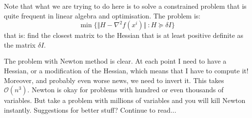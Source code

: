 \par Note that what we are trying to do here is to solve a constrained problem that is quite frequent in linear algebra and optimisation. The problem is:
\begin{equation}
    \min \{\Vert H - \nabla^2 f(x^i) \Vert\ : H \succeq \delta I\}
\end{equation}
that is: find the closest matrix to the Hessian that is at least positive definite as the matrix $\delta I$.
\par The problem with Newton method is clear. At each point I need to have a Hessian, or a modification of the Hessian, which means that I have to compute it! Moreover, and probably even worse news, we need to invert it. This takes $\mathcal{O}(n^3)$. Newton is okay for problems with hundred or even thousands of variables. But take a problem with millions of variables and you will kill Newton instantly. Suggestions for better stuff? Continue to read...
%
%
%
